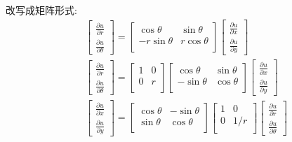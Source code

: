 	改写成矩阵形式:
	\[ 
\begin{aligned}
	&\begin{bmatrix}
	   \frac{\partial u}{\partial r} \\
	   \frac{\partial u}{\partial \theta} 
	\end{bmatrix}
	=
	\begin{bmatrix}
		\cos \theta &  \sin \theta \\
		-r \sin \theta& r\cos \theta \\  
	\end{bmatrix}
	\begin{bmatrix}
		\frac{\partial u}{\partial x} \\
		\frac{\partial u}{\partial y} 
	 \end{bmatrix}\\
	&\begin{bmatrix}
		\frac{\partial u}{\partial r} \\
		\frac{\partial u}{\partial \theta} 
	 \end{bmatrix}
	 =
	 \begin{bmatrix}
		1 &  0 \\
		0 & r \\  
	\end{bmatrix}
	 \begin{bmatrix}
		 \cos \theta &  \sin \theta \\
		 -\sin \theta& \cos \theta \\  
	 \end{bmatrix}
	 \begin{bmatrix}
		 \frac{\partial u}{\partial x} \\
		 \frac{\partial u}{\partial y} 
	  \end{bmatrix}\\
	 &\begin{bmatrix}
		\frac{\partial u}{\partial x} \\
		\frac{\partial u}{\partial y} 
	 \end{bmatrix}
	 =
	 \begin{bmatrix}
		 \cos \theta &  -\sin \theta \\
		 \sin \theta& \cos \theta \\  
	 \end{bmatrix}
	 \begin{bmatrix}
		1 &  0 \\
		0 & 1/r \\  
	\end{bmatrix}
	 \begin{bmatrix}
		 \frac{\partial u}{\partial r} \\
		 \frac{\partial u}{\partial \theta} 
	  \end{bmatrix}\\
\end{aligned}
	  \]




